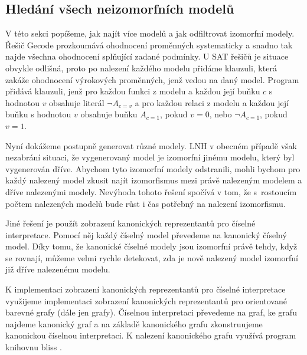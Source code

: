 \subsection{Hledání všech neizomorfních modelů}

V této sekci popíšeme, jak najít více modelů a jak odfiltrovat
izomorfní modely. Řešič Gecode prozkoumává ohodnocení
proměnných systematicky a snadno tak najde všechna ohodnocení splňující
zadané podmínky. U SAT řešičů je situace obvykle odlišná,
proto po nalezení každého modelu přidáme klauzuli,
která zakáže ohodnocení výrokových proměnných, jenž vedou na daný model.
Program \crossbow{} přidává klauzuli, jenž pro každou
funkci z modelu a každou její buňku $c$ s hodnotou $v$
obsahuje literál $\neg A_{c=v}$ a pro každou relaci z modelu a každou její
buňku s hodnotou $v$ obsahuje buňku $A_{c=1}$, pokud $v = 0$, nebo
$\neg A_{c=1}$, pokud $v = 1$.

Nyní dokážeme postupně generovat různé modely.
LNH v obecném případě však nezabrání situaci,
že vygenerovaný model je izomorfní jinému modelu, který byl
vygenerován dříve.
Abychom tyto izomorfní modely odstranili,
mohli bychom pro každý nalezený model
zkusit najít izomorfismus mezi právě nalezeným modelem
a dříve nalezenými modely.
Nevýhoda tohoto řešení spočívá v tom,
že s~rostoucím počtem nalezených modelů bude růst
i čas potřebný na nalezení izomorfismu.

Jiné řešení je použít zobrazení kanonických reprezentantů pro číselné
interpretace. Pomocí něj každý číselný model převedeme
na kanonický číselný model. Díky tomu, že kanonické číselné modely
jsou izomorfní právě tehdy, když se rovnají, můžeme velmi rychle
detekovat, zda je nově nalezený model izomorfní již
dříve nalezenému modelu.

K implementaci zobrazení kanonických reprezentantů
pro číselné interpretace využijeme implementaci
zobrazení kanonických reprezentantů pro orientované barevné grafy
(dále jen grafy). Číselnou interpretaci převedeme na graf,
ke grafu najdeme kanonický graf a na základě kanonického grafu
zkonstruujeme kanonickou číselnou interpretaci.
K nalezení kanonického grafu využívá program
\crossbow{} knihovnu bliss \cite{bliss}.

